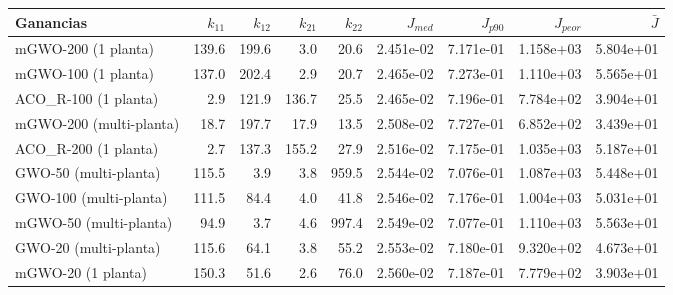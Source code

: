 \begin{tabular}{lrrrrrrrr}
\hline
Ganancias & $k_{11}$ & $k_{12}$ & $k_{21}$ & $k_{22}$ & $J_{med}$ & $J_{p90}$ & $J_{peor}$ & $\bar J$ \\
\hline
mGWO-200 (1 planta) & 139.6 & 199.6 & 3.0 & 20.6 & 2.451e-02 & 7.171e-01 & 1.158e+03 & 5.804e+01 \\
mGWO-100 (1 planta) & 137.0 & 202.4 & 2.9 & 20.7 & 2.465e-02 & 7.273e-01 & 1.110e+03 & 5.565e+01 \\
ACO\_R-100 (1 planta) & 2.9 & 121.9 & 136.7 & 25.5 & 2.465e-02 & 7.196e-01 & 7.784e+02 & 3.904e+01 \\
mGWO-200 (multi-planta) & 18.7 & 197.7 & 17.9 & 13.5 & 2.508e-02 & 7.727e-01 & 6.852e+02 & 3.439e+01 \\
ACO\_R-200 (1 planta) & 2.7 & 137.3 & 155.2 & 27.9 & 2.516e-02 & 7.175e-01 & 1.035e+03 & 5.187e+01 \\
GWO-50 (multi-planta) & 115.5 & 3.9 & 3.8 & 959.5 & 2.544e-02 & 7.076e-01 & 1.087e+03 & 5.448e+01 \\
GWO-100 (multi-planta) & 111.5 & 84.4 & 4.0 & 41.8 & 2.546e-02 & 7.176e-01 & 1.004e+03 & 5.031e+01 \\
mGWO-50 (multi-planta) & 94.9 & 3.7 & 4.6 & 997.4 & 2.549e-02 & 7.077e-01 & 1.110e+03 & 5.563e+01 \\
GWO-20 (multi-planta) & 115.6 & 64.1 & 3.8 & 55.2 & 2.553e-02 & 7.180e-01 & 9.320e+02 & 4.673e+01 \\
mGWO-20 (1 planta) & 150.3 & 51.6 & 2.6 & 76.0 & 2.560e-02 & 7.187e-01 & 7.779e+02 & 3.903e+01 \\
\hline
\end{tabular}
